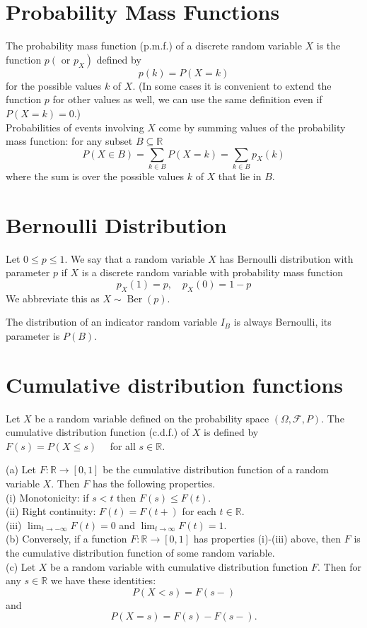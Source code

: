 \documentclass[11pt]{elegantbook}
\begin{document}
\section{Probability Mass Functions}
\begin{definition}
The probability mass function (p.m.f.) of a discrete random variable $X$ is the function $p\left(\right.$ or $\left.p_X\right)$ defined by
$$
p(k)=P(X=k)
$$
for the possible values $k$ of $X$. (In some cases it is convenient to extend the function $p$ for other values as well, we can use the same definition even if $P(X=k)=0$.) \\
Probabilities of events involving $X$ come by summing values of the probability mass function: for any subset $B \subseteq \mathbb{R}$
$$
P(X \in B)=\sum_{k \in B} P(X=k)=\sum_{k \in B} p_X(k)
$$
where the sum is over the possible values $k$ of $X$ that lie in $B$.
\end{definition}

\section{Bernoulli Distribution}
\begin{definition}
Let $0 \leq p \leq 1$. We say that a random variable $X$ has Bernoulli distribution with parameter $p$ if $X$ is a discrete random variable with probability mass function
$$
p_X(1)=p, \quad p_X(0)=1-p
$$
We abbreviate this as $X \sim \operatorname{Ber}(p)$.
\end{definition}
\begin{note}
The distribution of an indicator random variable $I_B$ is always Bernoulli, its parameter is $P(B)$.
\end{note}
\section{Cumulative distribution functions}
\begin{definition}
Let $X$ be a random variable defined on the probability space $(\Omega, \mathcal{F}, P)$. The cumulative distribution function (c.d.f.) of $X$ is defined by
$F(s)=P(X \leq s) \quad$ for all $s \in \mathbb{R}$.
\end{definition}
\begin{proposition}
    (a) Let $F: \mathbb{R} \rightarrow[0,1]$ be the cumulative distribution function of a random variable $X$. Then $F$ has the following properties.\\
(i) Monotonicity: if $s<t$ then $F(s) \leq F(t)$.\\
(ii) Right continuity: $F(t)=F(t+)$ for each $t \in \mathbb{R}$.\\
(iii) $\lim _{t \rightarrow-\infty} F(t)=0$ and $\lim _{t \rightarrow \infty} F(t)=1$.\\
(b) Conversely, if a function $F: \mathbb{R} \rightarrow[0,1]$ has properties (i)-(iii) above, then $F$ is the cumulative distribution function of some random variable.\\
(c) Let $X$ be a random variable with cumulative distribution function $F$. Then for any $s \in \mathbb{R}$ we have these identities:
$$
P(X<s)=F(s-)
$$
and
$$
P(X=s)=F(s)-F(s-) .
$$
\end{proposition}
\end{document}
